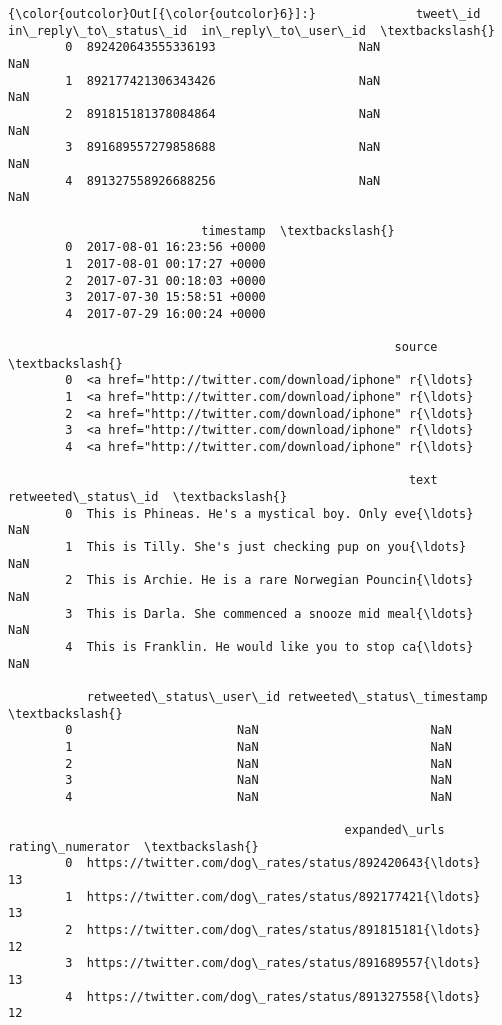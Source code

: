 \documentclass[11pt]{article}
\begin{document}
\begin{Verbatim}[commandchars=\\\{\}]
{\color{outcolor}Out[{\color{outcolor}6}]:}              tweet\_id  in\_reply\_to\_status\_id  in\_reply\_to\_user\_id  \textbackslash{}
        0  892420643555336193                    NaN                  NaN   
        1  892177421306343426                    NaN                  NaN   
        2  891815181378084864                    NaN                  NaN   
        3  891689557279858688                    NaN                  NaN   
        4  891327558926688256                    NaN                  NaN   
        
                           timestamp  \textbackslash{}
        0  2017-08-01 16:23:56 +0000   
        1  2017-08-01 00:17:27 +0000   
        2  2017-07-31 00:18:03 +0000   
        3  2017-07-30 15:58:51 +0000   
        4  2017-07-29 16:00:24 +0000   
        
                                                      source  \textbackslash{}
        0  <a href="http://twitter.com/download/iphone" r{\ldots}   
        1  <a href="http://twitter.com/download/iphone" r{\ldots}   
        2  <a href="http://twitter.com/download/iphone" r{\ldots}   
        3  <a href="http://twitter.com/download/iphone" r{\ldots}   
        4  <a href="http://twitter.com/download/iphone" r{\ldots}   
        
                                                        text  retweeted\_status\_id  \textbackslash{}
        0  This is Phineas. He's a mystical boy. Only eve{\ldots}                  NaN   
        1  This is Tilly. She's just checking pup on you{\ldots}                  NaN   
        2  This is Archie. He is a rare Norwegian Pouncin{\ldots}                  NaN   
        3  This is Darla. She commenced a snooze mid meal{\ldots}                  NaN   
        4  This is Franklin. He would like you to stop ca{\ldots}                  NaN   
        
           retweeted\_status\_user\_id retweeted\_status\_timestamp  \textbackslash{}
        0                       NaN                        NaN   
        1                       NaN                        NaN   
        2                       NaN                        NaN   
        3                       NaN                        NaN   
        4                       NaN                        NaN   
        
                                               expanded\_urls  rating\_numerator  \textbackslash{}
        0  https://twitter.com/dog\_rates/status/892420643{\ldots}                13   
        1  https://twitter.com/dog\_rates/status/892177421{\ldots}                13   
        2  https://twitter.com/dog\_rates/status/891815181{\ldots}                12   
        3  https://twitter.com/dog\_rates/status/891689557{\ldots}                13   
        4  https://twitter.com/dog\_rates/status/891327558{\ldots}                12   
        

\end{Verbatim}
\end{document}
